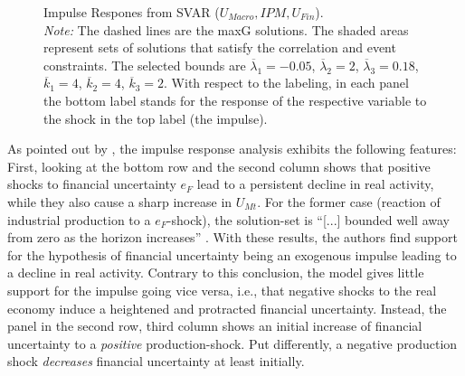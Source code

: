 \documentclass[a4paper,11pt,listof=nochaptergap,oneside,pointednumbers,bibtotoc,bigheadings,liststotoc]{scrbook}
\theoremstyle{mysatz}
\theoremstyle{mydefinition}
\theoremstyle{mytheorem}
\theoremstyle{mybemerkung}
\begin{document}
\begin{figure}[!h]
   \centering
   \setlength\fboxsep{0pt}
   \setlength\fboxrule{0pt}
      \caption[Impulse Respones from SVAR ($U_{Macro}, IPM, U_{Fin}$).]{Impulse Respones from SVAR ($U_{Macro}, IPM, U_{Fin}$).\\
      \textit{Note:}  The dashed lines are the maxG solutions. The shaded areas represent sets of solutions that satisfy the correlation and event constraints. The selected bounds are $\overline{\lambda}_1 = -0.05$, $\overline{\lambda}_2 = 2$, $\overline{\lambda}_3 = 0.18$, $\overline{k}_1 = 4$, $\overline{k}_2 = 4$, $\overline{k}_3 = 2$. With respect to the labeling, in each panel the bottom label stands for the response of the respective variable to the shock in the top label (the impulse).}   \label{fig:impulse.responses_all.SVAR}
\end{figure}

As pointed out by \citet{ludvigsonetal:18}, the impulse response analysis exhibits the following features: First, looking at the bottom row and the second column shows that positive shocks to financial uncertainty $e_F$ lead to a persistent decline in real activity, while they also cause a sharp increase in $U_{Mt}$. For the former case (reaction of industrial production to a $e_F$-shock), the solution-set is ``[...] bounded well away from zero as the horizon increases'' \citep[p. 19]{ludvigsonetal:18}. With these results, the authors find support for the hypothesis of financial uncertainty being an exogenous impulse leading to a decline in real activity. Contrary to this conclusion, the model gives little support for the impulse going vice versa, i.e., that negative shocks to the real economy induce a heightened and protracted financial uncertainty. Instead, the panel in the second row, third column shows an initial increase of financial uncertainty to a \textit{positive} production-shock. Put differently, a negative production shock \textit{decreases} financial uncertainty at least initially.
\end{document}
